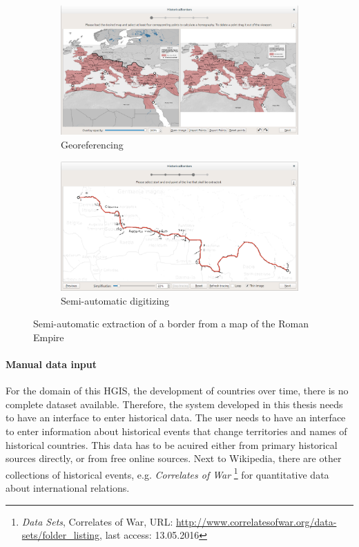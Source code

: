 \begin{figure}[ht]
  \centering
  \begin{subfigure}{0.48\textwidth}
    \centering
    \includegraphics[width=0.95\linewidth]{graphics/basics/hibo1.png}
    \caption{Georeferencing}
  \end{subfigure}
  \begin{subfigure}{0.48\textwidth}
    \centering
    \includegraphics[width=0.95\linewidth]{graphics/basics/hibo2.png}
    \caption{Semi-automatic digitizing}
  \end{subfigure}
  \caption{Semi-automatic extraction of a border from a map of the Roman Empire \protect\footnotemark}
  \label{fig:hibo}
\end{figure}



\paragraph{Manual data input} %
\label{par:manual_data_input}

For the domain of this HGIS, the development of countries over time, there is no complete dataset available. Therefore, the system developed in this thesis needs to have an interface to enter historical data. The user needs to have an interface to enter information about historical events that change territories and names of historical countries. This data has to be acuired either from primary historical sources directly, or from free online sources. Next to Wikipedia, there are other collections of historical events, e.g. \emph{Correlates of War}
\footnote{
  \textit{Data Sets},
  Correlates of War,
  URL: \url{http://www.correlatesofwar.org/data-sets/folder_listing},
  last access: 13.05.2016
}
for quantitative data about international relations.


